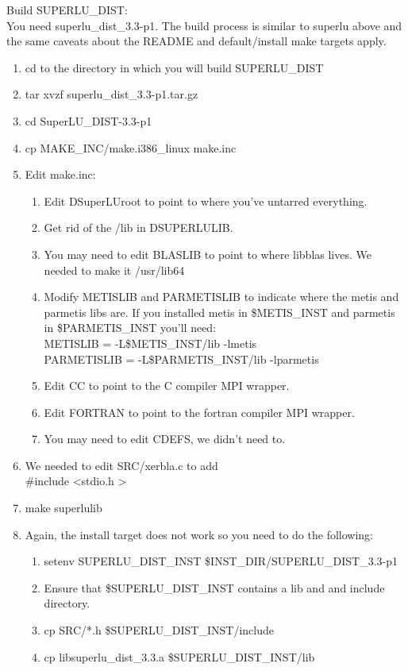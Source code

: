 \documentclass[11pt]{amsart}
\begin{document}
Build SUPERLU\_DIST: \\
You need superlu\_dist\_3.3-p1.  The build process is similar to superlu above
and the same caveats about the README and default/install make targets apply.
\begin{enumerate}
\item cd to the directory in which you will build SUPERLU\_DIST
\item tar xvzf superlu\_dist\_3.3-p1.tar.gz
\item cd SuperLU\_DIST-3.3-p1
\item cp MAKE\_INC/make.i386\_linux make.inc
\item Edit make.inc:
\begin{enumerate}
\item Edit DSuperLUroot to point to where you've untarred everything.
\item Get rid of the /lib in DSUPERLULIB.
\item You may need to edit BLASLIB to point to where libblas lives.  We needed
to make it /usr/lib64
\item Modify METISLIB and PARMETISLIB to indicate where the metis and \\
parmetis libs are.  If you installed metis in \$METIS\_INST and parmetis in
\$PARMETIS\_INST you'll need: \\
METISLIB = -L\$METIS\_INST/lib -lmetis \\
PARMETISLIB = -L\$PARMETIS\_INST/lib -lparmetis
\item  Edit CC to point to the C compiler MPI wrapper.
\item Edit FORTRAN to point to the fortran compiler MPI wrapper.
\item You may need to edit CDEFS, we didn't need to.
\end{enumerate}
\item We needed to edit SRC/xerbla.c to add \\
\#include \textless stdio.h \textgreater
\item make superlulib
\item Again, the install target does not work so you need to do the following:
\begin{enumerate}
\item setenv SUPERLU\_DIST\_INST \$INST\_DIR/SUPERLU\_DIST\_3.3-p1
\item Ensure that \$SUPERLU\_DIST\_INST contains a lib and and include
directory.
\item cp SRC/*.h \$SUPERLU\_DIST\_INST/include
\item cp libsuperlu\_dist\_3.3.a \$SUPERLU\_DIST\_INST/lib

\end{enumerate}
\end{enumerate}
\end{document}

